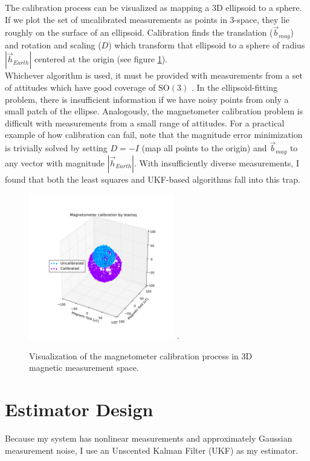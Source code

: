 \documentclass[conference]{IEEEtran}
\begin{document}
The calibration process can be visualized as mapping a 3D ellipsoid to a sphere. If we plot the set of uncalibrated measurements as points in 3-space, they lie roughly on the surface of an ellipsoid. Calibration finds the translation ($\vec{b}_{mag}$) and rotation and scaling ($D$) which transform that ellipsoid to a sphere of radius $|\vec{h}_{Earth}|$ centered at the origin (see figure \ref{fig:mag_cal}).\\

Whichever algorithm is used, it must be provided with measurements from a set of attitudes which have good coverage of $\mathrm{SO(3)}$ \cite{hardsoftiron}. In the ellipsoid-fitting problem, there is insufficient information if we have noisy points from only a small patch of the ellipse. Analogously, the magnetometer calibration problem is difficult with measurements from a small range of attitudes. For a practical example of how calibration can fail, note that the magnitude error minimization is trivially solved by setting $D = -I$ (map all points to the origin) and $\vec{b}_{mag}$ to any vector with magnitude $|\vec{h}_{Earth}|$. With insufficiently diverse measurements, I found that both the least squares and UKF-based algorithms fall into this trap.\\


\begin{figure}[!t]
  \centering
  \includegraphics[width=2.5in]{figures/mag_cal.pdf}
  \DeclareGraphicsExtensions.
  \caption{Visualization of the magnetometer calibration process in 3D magnetic measurement space.}
  \label{fig:mag_cal}
\end{figure}



\section{Estimator Design}
Because my system has nonlinear measurements and approximately Gaussian measurement noise, I use an Unscented Kalman Filter (UKF) as my estimator.
\end{document}
